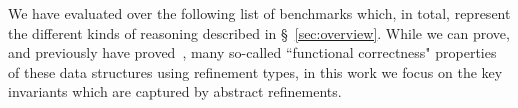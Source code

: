 \begin{comment}
\mypara{Implementation}
%
\toolname verifies the contents of a single file (module) at a time as follows. 
%
First, the Haskell source is fed into GHC, which desugars the program
to GHC's ``core" intermediate representation~\cite{VytiniotisJM12}.
%
Second, the desugared program,
the type signatures for the module functions (which are to be verified) and 
the type signatures for externally imported functions (which are assumed to hold)
are sent to the constraint generator, which traverses the core bindings in a
syntax-directed manner to generate subtyping constraints.
%
The resulting constraints are simplified via our subtyping rules
(\S~\ref{sec:check}) into simple logical implication
constraints.
%
Finally, the implication constraints, together with the logical
qualifiers provided by the user and harvested from the type
signatures, are sent into an SMT- and abstract interpretation-based
fixpoint computation procedure that determines if the constraints are
satisfiable \cite{GrafSaidi97,Houdini}.
%
If so, the program is reported to be \emph{safe}.
%
Otherwise, each unsatisfiable constraint is mapped back to the
corresponding program source location that generated it and a
potential error is reported at that line in the program.
\end{comment}

We have evaluated \toolname over the following list of benchmarks
which, in total, represent the different kinds of reasoning described in
\S~\ref{sec:overview}.
%
While we can prove, and previously have proved~\cite{LiquidPLDI09},
many so-called ``functional correctness" properties of these data
structures using refinement types, in this work we focus on the key
invariants which are captured by abstract refinements.

